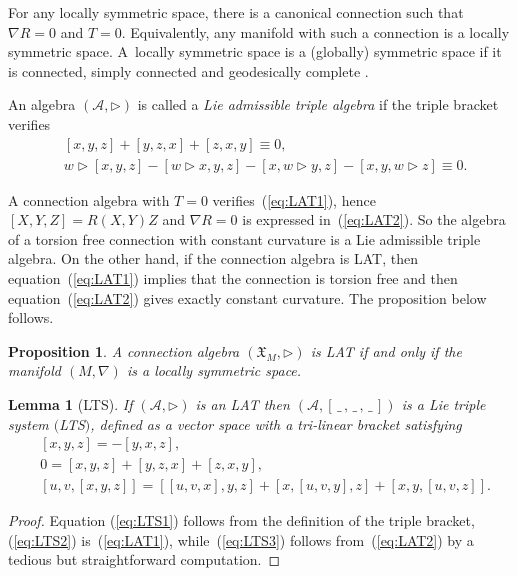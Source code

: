 \documentclass[10pt,a4paper]{amsart}
\newcommand{\refp}[1]{(\ref{#1})}
\newcommand{\noarg}{\,\_\,}
\numberwithin{equation}{section}
\newtheorem{Lemma}[Theorem]{Lemma}
\newtheorem{Proposition}[Theorem]{Proposition}
 { \theoremstyle{definition}
\newtheorem{Definition}[Theorem]{Definition}
\newtheorem{Note}[Theorem]{Note}
\newtheorem{Example}[Theorem]{Example}
\newtheorem{Remark}[Theorem]{Remark} }
\begin{document}
\begin{Remark}
For any locally symmetric space, there is a canonical connection such that $\nabla R=0$ and $T=0$. Equivalently, any manifold with such a connection is a locally symmetric space. A~locally symmetric space is a (globally) symmetric space if it is connected, simply connected and geodesically complete \cite{Loos1, Nomizu_54}. %
\end{Remark}

\begin{Definition}[LAT] An algebra $(\mathcal{A},\rhd)$ is called a \emph{Lie admissible triple algebra}
if the triple bracket verifies
\begin{align}
&[x,y,z]+[y,z,x] + [z,x,y]\equiv 0,\label{eq:LAT1}\\
&w\rhd [x,y,z] - [w\rhd x,y,z] - [x,w\rhd y, z] - [x,y,w\rhd z]\equiv 0.\label{eq:LAT2}
\end{align}
\end{Definition}

A connection algebra with $T=0$ verifies~\refp{eq:LAT1}, hence $[X,Y,Z] = R(X,Y)Z$ and $\nabla R=0$
is expressed in~\refp{eq:LAT2}. So the algebra of a torsion free connection with constant curvature is a Lie admissible triple algebra. On the other hand, if the connection algebra is LAT, then equation~(\ref{eq:LAT1}) implies that the connection is torsion free and then equation~(\ref{eq:LAT2}) gives exactly constant curvature. The proposition below follows.

\begin{Proposition}
 A connection algebra $(\mathfrak{X}_M, \rhd)$ is LAT if and only if the manifold $(M,\nabla)$ is a locally symmetric space.
\end{Proposition}

\begin{Lemma}[LTS]\label{lemma:LTS} If $(\mathcal{A},\rhd)$ is an LAT then $(\mathcal{A},[\noarg,\noarg,\noarg])$ is a \emph{Lie triple system} $($LTS$)$, defined as a vector space with a tri-linear bracket satisfying
\begin{align}
&[x,y,z]= -[y,x,z],\label{eq:LTS1}\\
&0= [x,y,z] + [y,z,x] + [z,x,y] ,\label{eq:LTS2}\\
&[u,v,[x,y,z]]= [[u,v,x],y,z]+[x,[u,v,y],z] + [x,y,[u,v,z]] .\label{eq:LTS3}
\end{align}
\end{Lemma}

\begin{proof} Equation \refp{eq:LTS1} follows from the definition of the triple bracket, \refp{eq:LTS2} is~\refp{eq:LAT1}, while~\refp{eq:LTS3} follows from~\refp{eq:LAT2} by a tedious but straightforward computation.
\end{proof}
\end{document}
